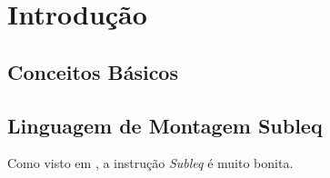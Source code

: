 \chapter{Introdução}

%

\section{Conceitos Básicos}


\section{Linguagem de Montagem Subleq}
\label{sec:subleq}

Como visto em \cite{subleq}, a instrução \textit{Subleq} é muito bonita.


